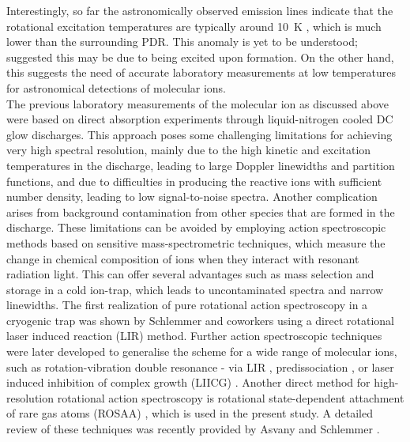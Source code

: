 Interestingly, so far the astronomically observed \co emission lines indicate that the rotational excitation temperatures are typically around 10~K \cite{Latter1993}, which is much lower than the surrounding PDR. This anomaly is yet to be understood; \citet{Stauber2009} suggested this may be due to \co being excited upon formation. On the other hand, this suggests the need of accurate laboratory measurements at low temperatures for astronomical detections of molecular ions. \\

The previous laboratory measurements of the \co molecular ion as discussed above were based on direct absorption experiments through liquid-nitrogen cooled DC glow discharges. This approach poses some challenging limitations for achieving very high spectral resolution, mainly due to the high kinetic and excitation temperatures in the discharge, leading to large Doppler linewidths and partition functions, and due to difficulties in producing the reactive ions with sufficient number density, leading to low signal-to-noise spectra. Another complication arises from background contamination from other species that are formed in the discharge. These limitations can be avoided by employing action spectroscopic methods based on sensitive mass-spectrometric techniques, which measure the change in chemical composition of ions when they interact with resonant radiation light. This can offer several advantages such as mass selection and storage in a cold ion-trap, which leads to uncontaminated spectra and narrow linewidths. The first realization of pure rotational action spectroscopy in a cryogenic trap was shown by Schlemmer and coworkers \cite{Asvany2008} using a direct rotational laser induced reaction (LIR) method. Further action spectroscopic techniques were later developed to generalise the scheme for a  wide range of molecular ions, such as rotation-vibration double resonance - via LIR \cite{Gartner2013,jusko_two-photon_2014}, predissociation \cite{Topfer2018}, or laser induced inhibition of complex growth (LIICG)  \cite{Markus2019}. Another direct method for high-resolution rotational action spectroscopy is rotational state-dependent attachment of rare gas atoms (ROSAA) \cite{brunken_laboratory_2014,Brunken2017}, which is used in the present study. A detailed review of these techniques was recently provided by Asvany and Schlemmer \cite{Asvany2021}. \\

